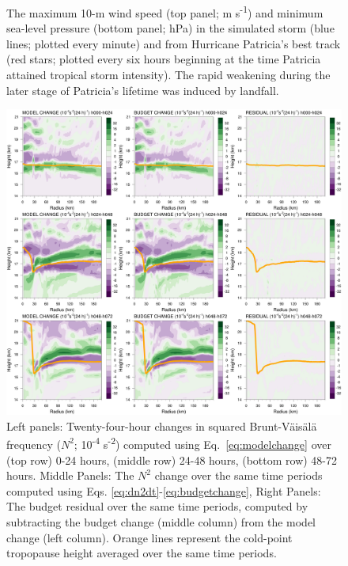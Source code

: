 \begin{figure}[ht]
\caption{The maximum 10-m wind speed (top panel; m s\textsuperscript{-1}) and minimum sea-level pressure (bottom panel; hPa) in the simulated storm (blue lines; plotted every minute) and from Hurricane Patricia's best track (red stars; plotted every six hours beginning at the time Patricia attained tropical storm intensity). The rapid weakening during the later stage of Patricia's lifetime was induced by landfall.}
\label{fig:vmax+pmin}
\end{figure}

\begin{figure}[ht]
\centerline{\includegraphics[width=39pc]{figures/mod+bud+res.png}}
\caption{Left panels: Twenty-four-hour changes in squared Brunt-V{\"a}is{\"a}l{\"a} frequency ($N^2$; 10\textsuperscript{-4} s\textsuperscript{-2}) computed using Eq.~\ref{eq:modelchange} over (top row) 0-24 hours, (middle row) 24-48 hours, (bottom row) 48-72 hours.
Middle Panels: The $N^2$ change over the same time periods computed using Eqs. \ref{eq:dn2dt}-\ref{eq:budgetchange}, %
Right Panels: The budget residual over the same time periods, computed by subtracting the budget change (middle column) from the model change (left column).
Orange lines represent the cold-point tropopause height averaged over the same time periods.}
\label{fig:mod+bud+res}
\end{figure}

